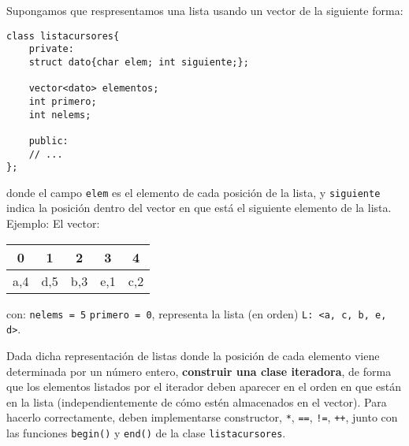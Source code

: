 \documentclass[12pt]{article}
\begin{document}
    \begin{ejercicio}[1 punto]
        Supongamos que respresentamos una lista usando un vector de la siguiente forma:
        \begin{listing}[H]
        \begin{verbatim}
class listacursores{
    private:
    struct dato{char elem; int siguiente;};

    vector<dato> elementos;
    int primero;
    int nelems;

    public:
    // ...
};
        \end{verbatim}
        \end{listing}
    \end{ejercicio}
    donde el campo \verb|elem| es el elemento de cada posición de la lista, y \verb|siguiente| indica la posición dentro del vector en que está el siguiente elemento de la lista. Ejemplo: El vector:
    \begin{table}[H]
    \centering
    \begin{tabular}{|c|c|c|c|c|}
        \hline
        0 & 1 & 2 & 3 & 4 \\
        \hline
        a,4 & d,5 & b,3 & e,1 & c,2 \\
        \hline
    \end{tabular}
    \end{table}
    con: \verb|nelems = 5| \verb|primero = 0|, representa la lista (en orden) \verb|L: <a, c, b, e, d>|.

    Dada dicha representación de listas donde la posición de cada elemento viene determinada por un número entero, \textbf{construir una clase iteradora}, de forma que los elementos listados por el iterador deben aparecer en el orden en que están en la lista (independientemente de cómo estén almacenados en el vector). Para hacerlo correctamente, deben implementarse constructor, \verb|*|, \verb|==|, \verb|!=|, \verb|++|, junto con las funciones \verb|begin()| y \verb|end()| de la clase \verb|listacursores|.
    
\end{document}
